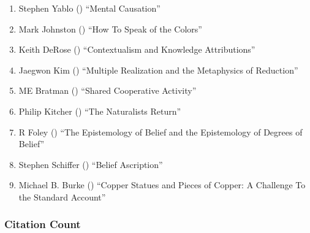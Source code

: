 \documentclass[
  10pt,
  letterpaper,
  DIV=11,
  numbers=noendperiod,
  twoside]{scrartcl}
\providecommand{\tightlist}{%
  \setlength{\itemsep}{0pt}\setlength{\parskip}{0pt}}\usepackage{longtable,booktabs,array}
\begin{document}
\begin{enumerate}
\def\labelenumi{\arabic{enumi}.}
\tightlist
\item
  Stephen Yablo () ``Mental
  Causation''
\item
  Mark Johnston () ``How To Speak
  of the Colors''
\item
  Keith DeRose () ``Contextualism
  and Knowledge Attributions''
\item
  Jaegwon Kim () ``Multiple
  Realization and the Metaphysics of Reduction''
\item
  ME Bratman () ``Shared
  Cooperative Activity''
\item
  Philip Kitcher () ``The
  Naturalists Return''
\item
  R Foley () ``The Epistemology
  of Belief and the Epistemology of Degrees of Belief''
\item
  Stephen Schiffer () ``Belief
  Ascription''
\item
  Michael B. Burke () ``Copper
  Statues and Pieces of Copper: A Challenge To the Standard Account''
\end{enumerate}

\subsubsection*{Citation Count}\label{sec-count-1992}
\end{document}
